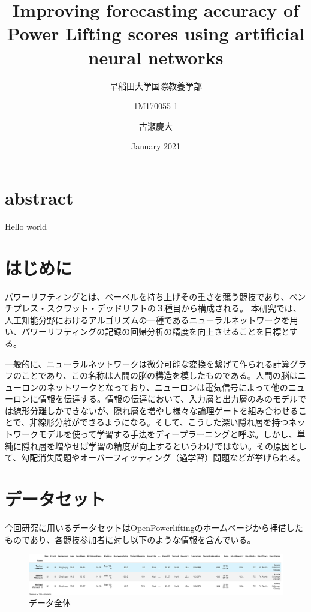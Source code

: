 \documentclass{article}
\title{Improving forecasting accuracy of Power Lifting scores using artificial neural networks}
\author{早稲田大学国際教養学部 }
\author{1M170055-1 }
\author{古瀬慶大 }
\date{January 2021}
\begin{document}
\maketitle

\section{abstract}
Hello world




\section{はじめに}
パワーリフティングとは、ベーベルを持ち上げその重さを競う競技であり、ベンチプレス・スクワット・デッドリフトの３種目から構成される。
本研究では、人工知能分野におけるアルゴリズムの一種であるニューラルネットワークを用い、パワーリフティングの記録の回帰分析の精度を向上させることを目標とする。

一般的に、ニューラルネットワークは微分可能な変換を繋げて作られる計算グラフのことであり、この名称は人間の脳の構造を模したものである。人間の脳はニューロンのネットワークとなっており、ニューロンは電気信号によって他のニューロンに情報を伝達する。情報の伝達において、入力層と出力層のみのモデルでは線形分離しかできないが、隠れ層を増やし様々な論理ゲートを組み合わせることで、非線形分離ができるようになる。そして、こうした深い隠れ層を持つネットワークモデルを使って学習する手法をディープラーニングと呼ぶ。しかし、単純に隠れ層を増やせば学習の精度が向上するというわけではない。その原因として、勾配消失問題やオーバーフィッティング（過学習）問題などが挙げられる。


\section{データセット}

今回研究に用いるデータセットはOpenPowerliftingのホームページから拝借したものであり、各競技参加者に対し以下のような情報を含んでいる。

\begin{figure}[H]
\begin{center}
\includegraphics[width=\linewidth]{data_head.png}
\caption{データ全体}
\end{center}
\end{figure}
\end{document}
